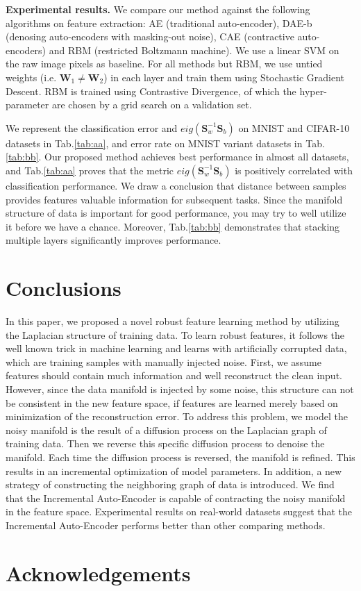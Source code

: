 \documentclass{article}
\def \SSS{\mathbf S}
\def \W{\mathbf W}
\begin{document}
{\bf Experimental results.}
We compare our method against the following algorithms on feature extraction:
AE (traditional auto-encoder),
DAE-b (denosing auto-encoders with masking-out noise),
CAE (contractive auto-encoders)
and RBM (restricted Boltzmann machine).
We use a linear SVM on the raw image pixels as baseline.
For all methods but RBM,
we use untied weights (i.e. $\W_1\neq\W_2$) in each layer
and train them using Stochastic Gradient Descent.
RBM is trained using Contrastive Divergence,
of which the hyper-parameter are chosen by a grid search on a validation set.

We represent the classification error and $eig(\SSS^{-1}_w\SSS_b)$
on MNIST and CIFAR-10 datasets in Tab.\ref{tab:aa},
and error rate on MNIST variant datasets in Tab.\ref{tab:bb}.
Our proposed method achieves best performance in almost all datasets,
and Tab.\ref{tab:aa} proves that the metric $eig(\SSS^{-1}_w\SSS_b)$ is positively correlated with classification performance.
We draw a conclusion that distance between samples provides features valuable information for subsequent tasks.
Since the manifold structure of data is important for good performance,
you may try to well utilize it before we have a chance.
Moreover,
Tab.\ref{tab:bb} demonstrates that stacking multiple layers significantly improves performance.


\section{Conclusions}
In this paper, we proposed a novel robust feature learning method by utilizing the Laplacian structure of training data. To learn robust features, it follows the well known trick in machine learning and learns with artificially corrupted data, which are training samples with manually injected noise. First, we assume features should contain much information and well reconstruct the clean input. However, since the data manifold is injected by some noise, this structure can not be consistent in the new feature space, if features are learned merely based on minimization of the reconstruction error. To address this problem, we model the noisy manifold is the result of a diffusion process on the Laplacian graph of training data. Then we reverse this specific diffusion process to denoise the manifold. Each time the diffusion process is reversed, the manifold is refined. This results in an incremental optimization of model parameters.  In addition, a new strategy of constructing the neighboring graph of data is introduced. We find that the Incremental Auto-Encoder is capable of contracting the noisy manifold in the feature space.  Experimental results on real-world datasets suggest that the Incremental Auto-Encoder performs better than other comparing methods.
\section*{Acknowledgements}





\end{document}
